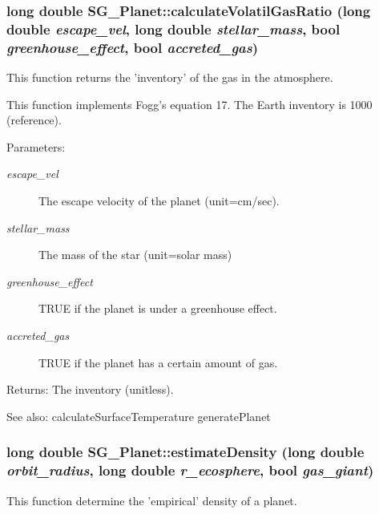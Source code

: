 \subsubsection{\setlength{\rightskip}{0pt plus 5cm}long double SG\_\-Planet::calculate\-Volatil\-Gas\-Ratio (long double {\em escape\_\-vel}, long double {\em stellar\_\-mass}, bool {\em greenhouse\_\-effect}, bool {\em accreted\_\-gas})\hspace{0.3cm}{\tt  [protected]}}\label{class_s_g___planet_b31}


This function returns the 'inventory' of the gas in the atmosphere. 

This function implements Fogg's equation 17. The Earth inventory is 1000 (reference). \begin{Desc}
\item[Parameters:]
\begin{description}
\item[{\em escape\_\-vel}]The escape velocity of the planet (unit=cm/sec). \item[{\em stellar\_\-mass}]The mass of the star (unit=solar mass) \item[{\em greenhouse\_\-effect}]TRUE if the planet is under a greenhouse effect. \item[{\em accreted\_\-gas}]TRUE if the planet has a certain amount of gas. \end{description}
\end{Desc}
\begin{Desc}
\item[Returns:]The inventory (unitless). \end{Desc}
\begin{Desc}
\item[See also:]calculate\-Surface\-Temperature generate\-Planet \end{Desc}
\subsubsection{\setlength{\rightskip}{0pt plus 5cm}long double SG\_\-Planet::estimate\-Density (long double {\em orbit\_\-radius}, long double {\em r\_\-ecosphere}, bool {\em gas\_\-giant})\hspace{0.3cm}{\tt  [protected]}}\label{class_s_g___planet_b2}


This function determine the 'empirical' density of a planet. 

